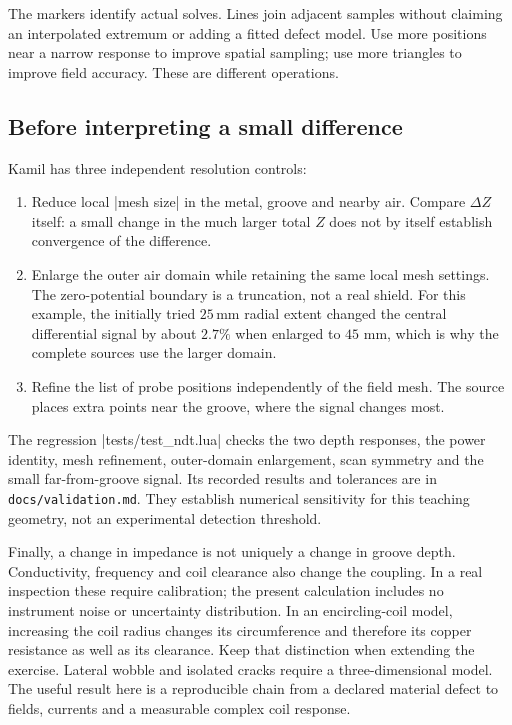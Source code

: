 The markers identify actual solves. Lines join adjacent samples without
claiming an interpolated extremum or adding a fitted defect model. Use more
positions near a narrow response to improve spatial sampling; use more
triangles to improve field accuracy. These are different operations.

\subsection{Before interpreting a small difference}
Kamil has three independent resolution controls:
\begin{enumerate}
\item Reduce local |mesh size| in the metal, groove and nearby air. Compare
$\Delta Z$ itself: a small change in the much larger total $Z$ does not by
itself establish convergence of the difference.
\item Enlarge the outer air domain while retaining the same local mesh
settings. The zero-potential boundary is a truncation, not a real shield.
For this example, the initially tried $25\,\mathrm{mm}$ radial extent changed
the central differential signal by about $2.7\%$ when enlarged to $45$ mm,
which is why the complete sources use the larger domain.
\item Refine the list of probe positions independently of the field mesh.
The source places extra points near the groove, where the signal changes most.
\end{enumerate}
The regression |tests/test_ndt.lua| checks the two depth responses, the power
identity, mesh refinement, outer-domain enlargement, scan symmetry and the
small far-from-groove signal. Its recorded results and tolerances are in
\nolinkurl{docs/validation.md}. They establish numerical sensitivity for this
teaching geometry, not an experimental detection threshold.

Finally, a change in impedance is not uniquely a change in groove depth.
Conductivity, frequency and coil clearance also change the coupling. In a
real inspection these require calibration; the present calculation includes
no instrument noise or uncertainty distribution. In an encircling-coil model,
increasing the coil radius changes its circumference and therefore its copper
resistance as well as its clearance. Keep that distinction when extending the
exercise. Lateral wobble and isolated cracks require a three-dimensional model.
The useful result here is a reproducible chain from a declared material defect
to fields, currents and a measurable complex coil response.

\clearpage
